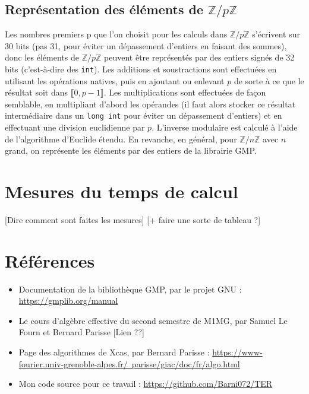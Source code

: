 \documentclass[french]{article}
\begin{document}
\subsection{Représentation des éléments de $\mathbb{Z}/p\mathbb{Z}$}
Les nombres premiers p que l'on choisit pour les calculs dans $\mathbb{Z}/p\mathbb{Z}$ s'écrivent sur 30 bits (pas 31, pour éviter un dépassement d'entiers en faisant des sommes), donc les éléments de $\mathbb{Z}/p\mathbb{Z}$ peuvent être représentés par des entiers signés de 32 bits (c'est-à-dire des {\tt int}).
Les additions et soustractions sont effectuées en utilisant les opérations natives, puis en ajoutant ou enlevant $p$ de sorte à ce que le résultat soit dans $\llbracket0,p-1\rrbracket$.
Les multiplications sont effectuées de façon semblable, en multipliant d'abord les opérandes (il faut alors stocker ce résultat intermédiaire dans un {\tt long int} pour éviter un dépassement d'entiers) et en effectuant une division euclidienne par $p$.
L'inverse modulaire est calculé à l'aide de l'algorithme d'Euclide étendu.
\newline
En revanche, en général, pour $\mathbb{Z}/n\mathbb{Z}$ avec $n$ grand, on représente les éléments par des entiers de la librairie GMP.
\section{Mesures du temps de calcul}
[Dire comment sont faites les mesures] [+ faire une sorte de tableau ?]
\section{Références}
\begin{itemize}
	\item Documentation de la bibliothèque GMP, par le projet GNU : \href{https://gmplib.org/manual/}{https://gmplib.org/manual}
	\item Le cours d'algèbre effective du second semestre de M1MG, par Samuel Le Fourn et Bernard Parisse [Lien ??]
	\item Page des algorithmes de Xcas, par Bernard Parisse : \href{https://www-fourier.univ-grenoble-alpes.fr/~parisse/giac/doc/fr/algo.html}{https://www-fourier.univ-grenoble-alpes.fr/~parisse/giac/doc/fr/algo.html}
	\item Mon code source pour ce travail : \href{https://github.com/Barni072/TER}{https://github.com/Barni072/TER}
\end{itemize}
\end{document}
